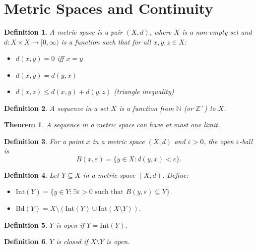 \documentclass{article}
\newtheorem{theorem}{Theorem}
\newtheorem{definition}{Definition}
\begin{document}
\section*{Metric Spaces and Continuity}

\begin{definition}
A \emph{metric space} is a pair $(X, d)$, where $X$ is a non-empty set and $d : X \times X \to [0, \infty)$ is a function such that for all $x, y, z \in X$:
\begin{itemize}
  \item $d(x, y) = 0$ iff $x = y$
  \item $d(x, y) = d(y, x)$
  \item $d(x, z) \leq d(x, y) + d(y, z)$ (triangle inequality)
\end{itemize}
\end{definition}

\begin{definition}
A \emph{sequence} in a set $X$ is a function from $\mathbb{N}$ (or $\mathbb{Z}^+$) to $X$.
\end{definition}

\begin{theorem}
A sequence in a metric space can have at most one limit.
\end{theorem}

\begin{definition}
For a point $x$ in a metric space $(X, d)$ and $\varepsilon > 0$, the \emph{open $\varepsilon$-ball} is
\[
B(x, \varepsilon) = \{ y \in X : d(y, x) < \varepsilon \}.
\]
\end{definition}

\begin{definition}
Let $Y \subseteq X$ in a metric space $(X, d)$. Define:
\begin{itemize}
  \item $\mathrm{Int}(Y) = \{ y \in Y : \exists \varepsilon > 0 \text{ such that } B(y, \varepsilon) \subseteq Y \}$.
  \item $\mathrm{Bd}(Y) = X \setminus (\mathrm{Int}(Y) \cup \mathrm{Int}(X \setminus Y))$.
\end{itemize}
\end{definition}

\begin{definition}
$Y$ is \emph{open} if $Y = \mathrm{Int}(Y)$.
\end{definition}

\begin{definition}
$Y$ is \emph{closed} if $X \setminus Y$ is open.
\end{definition}
\end{document}
